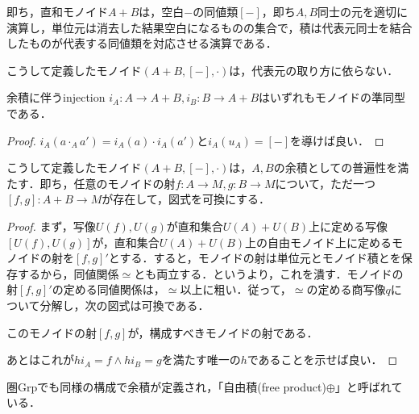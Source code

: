 \documentclass[uplatex, dvipdfmx]{jsarticle}
\begin{document}
\begin{example}[一般のモノイドの余積]
\begin{definition*}[一般のモノイドの余積]
        即ち，直和モノイド$A+B$は，空白$-$の同値類$[-]$，即ち$A,B$同士の元を適切に演算し，単位元は消去した結果空白になるものの集合で，積は代表元同士を結合したものが代表する同値類を対応させる演算である．
    \end{definition*}
    \begin{proposition*}
        こうして定義したモノイド$(A+B,[-],\cdot)$は，代表元の取り方に依らない．
    \end{proposition*}
    \begin{proposition*}
        余積に伴うinjection $i_A:A\to A+B,i_B:B\to A+B$はいずれもモノイドの準同型である．
    \end{proposition*}
    \begin{proof}
        $i_A(a\cdot_Aa')=i_A(a)\cdot i_A(a')$と$i_A(u_A)=[-]$を導けば良い．
    \end{proof}
    \begin{proposition*}
        こうして定義したモノイド$(A+B,[-],\cdot)$は，$A,B$の余積としての普遍性を満たす．即ち，任意のモノイドの射$f:A\to M,g:B\to M$について，ただ一つ$[f,g]:A+B\to M$が存在して，図式を可換にする．
    \end{proposition*}
    \begin{proof}
        まず，写像$U(f),U(g)$が直和集合$U(A)+U(B)$上に定める写像$[U(f),U(g)]$が，直和集合$U(A)+U(B)$上の自由モノイド上に定めるモノイドの射を$[f,g]'$とする．すると，モノイドの射は単位元とモノイド積とを保存するから，同値関係$\simeq$とも両立する．というより，これを潰す．モノイドの射$[f,g]'$の定める同値関係は，$\simeq$以上に粗い．従って，$\simeq$の定める商写像$q$について分解し，次の図式は可換である．
        \begin{center}
        \end{center}
        このモノイドの射$[f,g]$が，構成すべきモノイドの射である．

        あとはこれが$hi_A=f\land hi_B=g$を満たす唯一の$h$であることを示せば良い．
    \end{proof}
\end{example}

\begin{example*}
    圏Grpでも同様の構成で余積が定義され，「自由積(free product)$\oplus$」と呼ばれている．
\end{example*}
\end{document}
